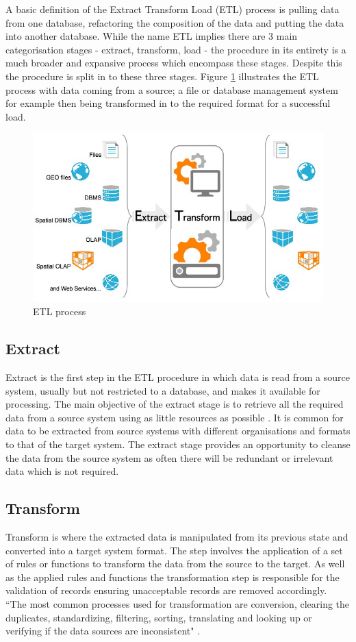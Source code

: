 A basic definition of the Extract Transform Load (ETL) process is pulling data from one database, refactoring the composition of the data and putting the data into another database. While the name ETL implies there are 3 main categorisation stages - extract, transform, load - the procedure in its entirety is a much broader and expansive process which encompass these stages. Despite this the procedure is split in to these three stages. Figure \ref{fig:etl} illustrates the ETL process with data coming from a source; a file or database management system for example then being transformed in to the required format for a successful load. \begin{figure}[h]\begin{center}\includegraphics[width=0.8\linewidth]{images/etl.jpg}\caption{ETL process}\label{fig:etl}\end{center}\end{figure}

\subsection{Extract}
Extract is the first step in the ETL procedure in which data is read from a source system, usually but not restricted to a database, and makes it available for processing. The main objective of the extract stage is to retrieve all the required data from a source system using as little resources as possible \cite{etlref1}. It is common for data to be extracted from source systems with different organisations and formats to that of the target system. The extract stage provides an opportunity to cleanse the data from the source system as often there will be redundant or irrelevant data which is not required.

\subsection{Transform}
Transform is where the extracted data is manipulated from its previous state and converted into a target system format. The step involves the application of a set of rules or functions to transform the data from the source to the target. As well as the applied rules and functions the transformation step is responsible for the validation of records ensuring unacceptable records are removed accordingly. ``The most common processes used for transformation are conversion, clearing the duplicates, standardizing, filtering, sorting, translating and looking up or verifying if the data sources are inconsistent" \cite{etlref2}.

